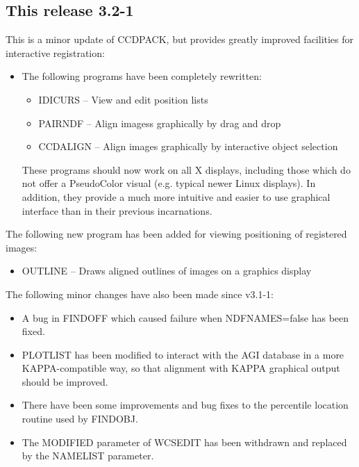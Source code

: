 \documentclass[twoside,11pt]{article}
\newcommand{\htmlref}[2]{#1}
\newcommand{\xref}[3]{#1}
\renewcommand{\_}{\texttt{\symbol{95}}}
\newcommand{\xroutine}[1]{\htmlref{{\sc #1}}{#1}}
\begin{document}
\subsection{This release 3.2-1}

  This is a minor update of CCDPACK, but provides greatly
  improved facilities for interactive registration:

  \begin{itemize}
  \item
     The following programs have been completely rewritten:
     \begin{itemize}
     \item \xroutine{IDICURS} -- View and edit position lists
     \item \xroutine{PAIRNDF}  -- 
           Align imagess graphically by drag and drop
     \item \xroutine{CCDALIGN} -- 
           Align images graphically by interactive object selection
     \end{itemize}

     These programs should now work on all X displays, including those
     which do not offer a PseudoColor visual (e.g. typical newer Linux
     displays).  In addition, they provide a much more intuitive and
     easier to use graphical interface than in their previous
     incarnations.
  \end{itemize}

  The following new program has been added for viewing positioning of
  registered images:
  \begin{itemize}
  \item \xroutine{OUTLINE} -- 
        Draws aligned outlines of images on a graphics display
  \end{itemize}


  The following minor changes have also been made since v3.1-1:
  \begin{itemize}
  \item
     A bug in \xroutine{FINDOFF} which caused failure when NDFNAMES=false has
     been fixed.
  \item
     \xroutine{PLOTLIST} has been modified to interact with the 
     \xref{AGI database}{sun95}{se_agitate}
     in a more \xref{KAPPA}{sun95}{}-compatible way, 
     so that alignment with KAPPA
     graphical output should be improved.
  \item
     There have been some improvements and bug fixes to the percentile
     location routine used by \xroutine{FINDOBJ}.
  \item
     The MODIFIED parameter of \xroutine{WCSEDIT} has been withdrawn and replaced
     by the NAMELIST parameter.
  \end{itemize}
\end{document}
